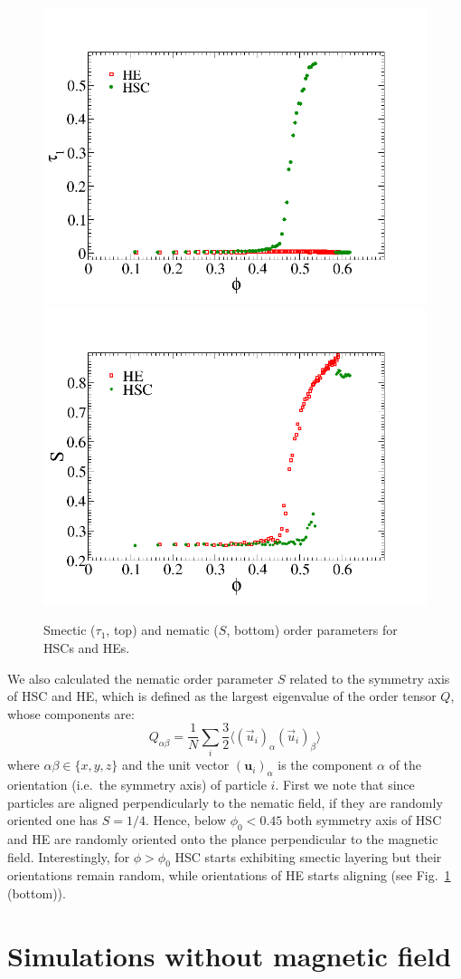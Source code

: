 \documentclass[aip,graphicx]{revtex4-1} %
\begin{document}
\begin{figure}
    \centering
    \includegraphics[width=0.45\columnwidth]{smordpar.png}
    \includegraphics[width=0.45\columnwidth]{nemop.png}  
    \caption{Smectic ($\tau_1$, top) and nematic ($S$, bottom) order parameters for HSCs and HEs.}\label{fig:ordpars}
\end{figure}

We also calculated the nematic order parameter $S$ related to the symmetry axis of HSC and HE, which
is defined as the largest eigenvalue of the order tensor $Q$, whose components are:
\begin{equation}
  Q_{\alpha\beta} = \frac{1}{N} \sum_i \frac{3}{2} \langle {(\vec{u}_i)}_\alpha {(\vec{u}_i)}_\beta\rangle
\label{eq:nemop}
\end{equation}
where $\alpha\beta\in\{x,y,z\}$ and the unit vector ${(\mathbf{u}_i)}_\alpha$ is the component $\alpha$ of the orientation (i.e.~the symmetry axis) of particle $i$.
First we note that since particles are aligned perpendicularly to the nematic field, if they are 
randomly oriented one has $S=1/4$. Hence, below $\phi_0 < 0.45$ both symmetry axis of HSC and HE are 
randomly oriented onto the plance perpendicular to the magnetic field.
Interestingly, for $\phi > \phi_0$ HSC starts exhibiting smectic layering but their orientations
remain random, while orientations of HE starts aligning (see Fig.~\ref{fig:ordpars} (bottom)).


\section{Simulations without magnetic field}
\end{document}
